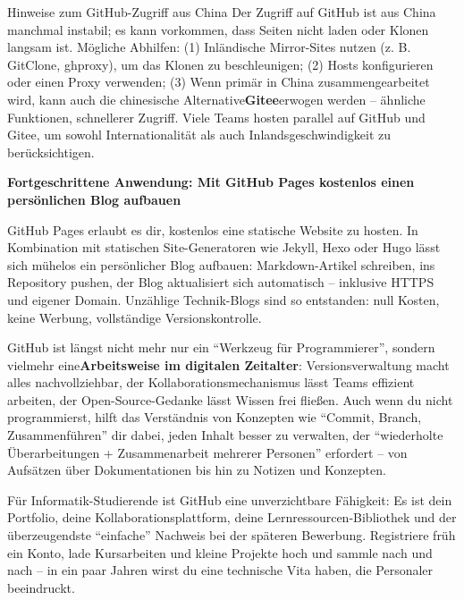 \begin{tcbinfo}{Hinweise zum GitHub-Zugriff aus China}
Der Zugriff auf GitHub ist aus China manchmal instabil; es kann vorkommen, dass Seiten nicht laden oder Klonen langsam ist. Mögliche Abhilfen: (1) Inländische Mirror-Sites nutzen (z. B. GitClone, ghproxy), um das Klonen zu beschleunigen; (2) Hosts konfigurieren oder einen Proxy verwenden; (3) Wenn primär in China zusammengearbeitet wird, kann auch die chinesische Alternative\textbf{Gitee}erwogen werden – ähnliche Funktionen, schnellerer Zugriff. Viele Teams hosten parallel auf GitHub und Gitee, um sowohl Internationalität als auch Inlandsgeschwindigkeit zu berücksichtigen.

\end{tcbinfo}

\textbf{Fortgeschrittene Anwendung: Mit GitHub Pages kostenlos einen persönlichen Blog aufbauen}\par

GitHub Pages erlaubt es dir, kostenlos eine statische Website zu hosten. In Kombination mit statischen Site-Generatoren wie Jekyll, Hexo oder Hugo lässt sich mühelos ein persönlicher Blog aufbauen: Markdown-Artikel schreiben, ins Repository pushen, der Blog aktualisiert sich automatisch – inklusive HTTPS und eigener Domain. Unzählige Technik-Blogs sind so entstanden: null Kosten, keine Werbung, vollständige Versionskontrolle.


GitHub ist längst nicht mehr nur ein “Werkzeug für Programmierer”, sondern vielmehr eine\textbf{Arbeitsweise im digitalen Zeitalter}: Versionsverwaltung macht alles nachvollziehbar, der Kollaborationsmechanismus lässt Teams effizient arbeiten, der Open-Source-Gedanke lässt Wissen frei fließen. Auch wenn du nicht programmierst, hilft das Verständnis von Konzepten wie “Commit, Branch, Zusammenführen” dir dabei, jeden Inhalt besser zu verwalten, der “wiederholte Überarbeitungen + Zusammenarbeit mehrerer Personen” erfordert – von Aufsätzen über Dokumentationen bis hin zu Notizen und Konzepten.

Für Informatik-Studierende ist GitHub eine unverzichtbare Fähigkeit: Es ist dein Portfolio, deine Kollaborationsplattform, deine Lernressourcen-Bibliothek und der überzeugendste “einfache” Nachweis bei der späteren Bewerbung. Registriere früh ein Konto, lade Kursarbeiten und kleine Projekte hoch und sammle nach und nach – in ein paar Jahren wirst du eine technische Vita haben, die Personaler beeindruckt.

